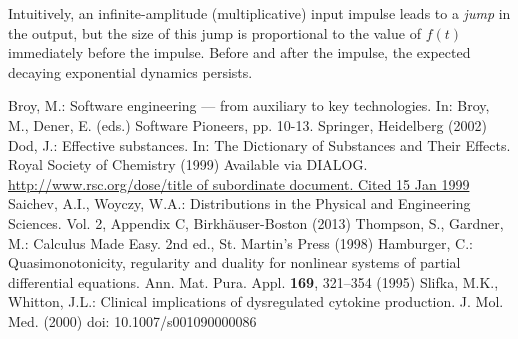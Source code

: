 \begin{svgraybox}

  Intuitively, an infinite-amplitude (multiplicative) input impulse leads to a \textit{jump} in the output, but the size of this jump is proportional to the value of \(f(t)\) immediately before the impulse. Before and after the impulse, the expected decaying exponential dynamics persists.
\end{svgraybox}	
 



\begin{thebibliography}{99.}%
 Broy, M.: Software engineering --- from auxiliary to key technologies. In: Broy, M., Dener, E. (eds.) Software Pioneers, pp. 10-13. Springer, Heidelberg (2002)
%
 Dod, J.: Effective substances. In: The Dictionary of Substances and Their Effects. Royal Society of Chemistry (1999) Available via DIALOG. \\
\url{http://www.rsc.org/dose/title of subordinate document. Cited 15 Jan 1999}
%
 Saichev, A.I., Woyczy, W.A.: Distributions in the Physical and Engineering Sciences. Vol. 2, Appendix C, Birkhäuser-Boston (2013) 
%
 Thompson, S., Gardner, M.: Calculus Made Easy. 2nd ed., St. Martin's Press (1998) 
%
 Hamburger, C.: Quasimonotonicity, regularity and duality for nonlinear systems of partial differential equations. Ann. Mat. Pura. Appl. \textbf{169}, 321--354 (1995)
%
 Slifka, M.K., Whitton, J.L.: Clinical implications of dysregulated cytokine production. J. Mol. Med. (2000) doi: 10.1007/s001090000086 

\end{thebibliography}

